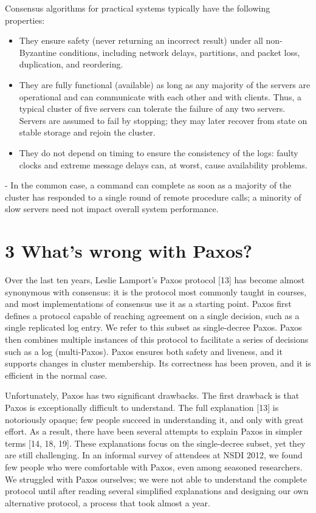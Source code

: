 \documentclass[
]{article}
\providecommand{\tightlist}{%
  \setlength{\itemsep}{0pt}\setlength{\parskip}{0pt}}
\begin{document}
Consensus algorithms for practical systems typically have the following
properties:

\begin{itemize}
\tightlist
\item
  They ensure safety (never returning an incorrect result) under all
  non-Byzantine conditions, including network delays, partitions, and
  packet loss, duplication, and reordering.\\
\item
  They are fully functional (available) as long as any majority of the
  servers are operational and can communicate with each other and with
  clients. Thus, a typical cluster of five servers can tolerate the
  failure of any two servers. Servers are assumed to fail by stopping;
  they may later recover from state on stable storage and rejoin the
  cluster.\\
\item
  They do not depend on timing to ensure the consistency of the logs:
  faulty clocks and extreme message delays can, at worst, cause
  availability problems.
\end{itemize}

- In the common case, a command can complete as soon as a majority of
the cluster has responded to a single round of remote procedure calls; a
minority of slow servers need not impact overall system performance.

\section{3 What's wrong with Paxos?}\label{whats-wrong-with-paxos}

Over the last ten years, Leslie Lamport's Paxos protocol {[}13{]} has
become almost synonymous with consensus: it is the protocol most
commonly taught in courses, and most implementations of consensus use it
as a starting point. Paxos first defines a protocol capable of reaching
agreement on a single decision, such as a single replicated log entry.
We refer to this subset as single-decree Paxos. Paxos then combines
multiple instances of this protocol to facilitate a series of decisions
such as a log (multi-Paxos). Paxos ensures both safety and liveness, and
it supports changes in cluster membership. Its correctness has been
proven, and it is efficient in the normal case.

Unfortunately, Paxos has two significant drawbacks. The first drawback
is that Paxos is exceptionally difficult to understand. The full
explanation {[}13{]} is notoriously opaque; few people succeed in
understanding it, and only with great effort. As a result, there have
been several attempts to explain Paxos in simpler terms {[}14, 18,
19{]}. These explanations focus on the single-decree subset, yet they
are still challenging. In an informal survey of attendees at NSDI 2012,
we found few people who were comfortable with Paxos, even among seasoned
researchers. We struggled with Paxos ourselves; we were not able to
understand the complete protocol until after reading several simplified
explanations and designing our own alternative protocol, a process that
took almost a year.
\end{document}
